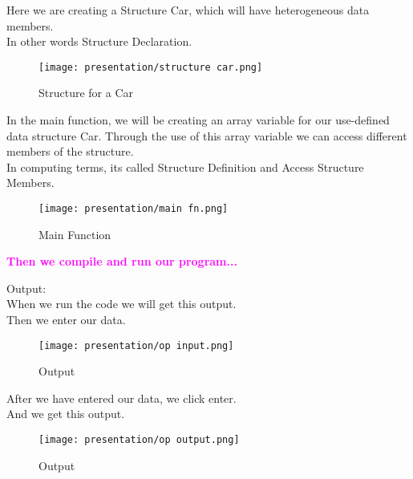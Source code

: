 \documentclass[13pt]{beamer}
\begin{document}
\begin{frame}
    Here we are creating a Structure Car, which will have heterogeneous data members. \\
    In other words Structure Declaration.
    \begin{figure}
        \centering
        \texttt{[image: presentation/structure car.png]}
        \caption{Structure for a Car}
        \label{fig:3}
    \end{figure}
\end{frame}

\begin{frame}
    In the main function, we will be creating an array variable for our use-defined data structure Car. Through the use of this array variable we can access different members of the structure. \\
    In computing terms, its called Structure Definition and Access Structure Members.
\end{frame}

\begin{frame}
    \begin{figure}
        \centering
        \texttt{[image: presentation/main fn.png]}
        \caption{Main Function}
        \label{fig:4}
    \end{figure}
\end{frame}

\begin{frame}
    \begin{center}
    \begin{large}
    \textcolor{magenta}{\textbf{Then we compile and run our program...}}
    \end{large}
    \end{center}
\end{frame}

\begin{frame}
    Output: \\
    When we run the code we will get this output. \\
    Then we enter our data. \\
    \begin{figure}
        \centering
        \texttt{[image: presentation/op input.png]}
        \caption{Output}
        \label{fig:5}
    \end{figure}
\end{frame}

\begin{frame}
    After we have entered our data, we click enter. \\
    And we get this output. \\
    \begin{figure}
        \centering
        \texttt{[image: presentation/op output.png]}
        \caption{Output}
        \label{fig:6}
    \end{figure}
\end{frame}
\end{document}
